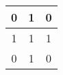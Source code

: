 \documentclass{beamer}
\begin{document}
\begin{frame}
	\begin{tabular}{|c|c|c|}
		\hline
		0 & 1 & 0 \\ \hline
		1 & 1 & 1 \\ \hline
		0 & 1 & 0 \\
		\hline
	\end{tabular}
\end{frame}
\end{document}
